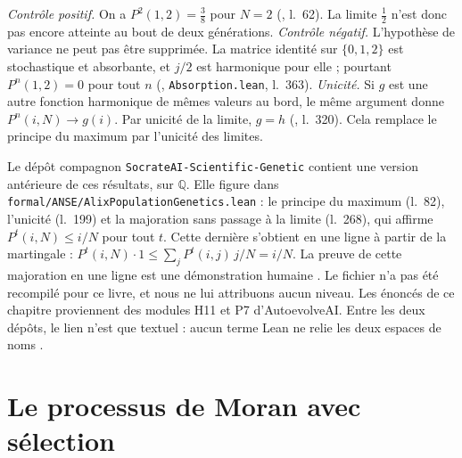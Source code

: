 \begin{remark}\label{ch4:rem:wfctl}
\emph{Contrôle positif.} On a $P^2(1,2)=\frac38$ pour $N=2$ (, l.~62). La limite
$\frac12$ n'est donc pas encore atteinte au bout de deux générations.
\emph{Contrôle négatif.} L'hypothèse de variance ne peut pas être supprimée. La matrice identité sur $\{0,1,2\}$
est stochastique et absorbante, et $j/2$ est harmonique pour elle ; pourtant $P^n(1,2)=0$ pour tout $n$
(, \texttt{Absorption.lean}, l.~363).
\emph{Unicité.} Si $g$ est une autre fonction harmonique de mêmes valeurs au bord, le même argument donne
$P^n(i,N)\to g(i)$. Par unicité de la limite, $g=h$ (, l.~320). Cela remplace le
principe du maximum par l'unicité des limites.
\end{remark}

\begin{remark}\label{ch4:rem:genetic}
Le dépôt compagnon \texttt{SocrateAI-Scientific-Genetic} \cite{ch4:Genetic} contient une version antérieure de ces résultats, sur
$\mathbb Q$. Elle figure dans \texttt{formal/ANSE/}\allowbreak\texttt{AlixPopulationGenetics.lean} : le principe du maximum
 (l.~82), l'unicité  (l.~199) et la majoration
sans passage à la limite  (l.~268), qui affirme $P^t(i,N)\le i/N$ pour tout $t$.
Cette dernière s'obtient en une ligne à partir de la martingale :
$P^t(i,N)\cdot1\le\sum_jP^t(i,j)\,j/N=i/N$. La preuve de cette majoration en une ligne est une démonstration humaine \tierC. Le fichier
n'a pas été recompilé pour ce livre, et nous ne lui attribuons aucun niveau. Les énoncés de ce chapitre
proviennent des modules H11 et P7 d'AutoevolveAI. Entre les deux dépôts, le lien n'est que textuel : aucun terme
Lean ne relie les deux espaces de noms \tierC.
\end{remark}

\section{Le processus de Moran avec sélection}\label{ch4:sec:moran}

